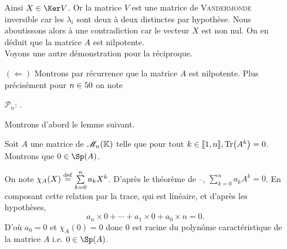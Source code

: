 \begin{demo}
\begin{itemize}

         Ainsi $X \in \Ker V$. Or la matrice $V$ est une matrice de \textsc{Vandermonde} inversible car les $\lambda_i$ sont deux à deux distinctes \note \marginnote[0cm]{\textcolor{red}{renvoyer vers la section sur Vandermonde}} par hypothèse. Nous aboutissons alors à une contradiction car le vecteur $X$ est non nul. On en déduit que la matrice $A$ est nilpotente. \\
        
        Voyons une autre démonstration pour la réciproque. \\ 
        \item[$(\Leftarrow)$] Montrons par récurrence que la matrice $A$ est nilpotente. Plus précisément pour $n \in 50$ on note
        \begin{center}
            $\mathscr{P}_n$: .
        \end{center}
        Montrons d'abord le lemme suivant.
        \begin{lemme}
            Soit $A$ une matrice de $\mathscr{M}_n(\mathbb{K})$ telle que pour tout $k \in \llbracket 1, n \rrbracket, \Tr(A^k) = 0$. Montrons que $0 \in \Sp(A)$.
        \end{lemme}
        On note $\chi_A(X) \overset{\mathrm{\tiny def}}{=} \sum\limits_{k=0}^n a_k X^k$. D'après le théorème de --, $\sum\limits_{k=0}^n a_k A^k = 0$. En composant cette relation par la trace, qui est linéaire, et d'après les hypothèses, 
        $$a_n \times 0 + \cdots + a_1 \times 0 + a_0 \times n = 0.$$
        D'où $a_0 = 0$ et $\chi_A(0) = 0$ donc $0$ est racine du polynôme caractéristique de la matrice $A$ i.e. $0 \in \Sp(A)$. \\
        

\end{itemize}
\end{demo}
